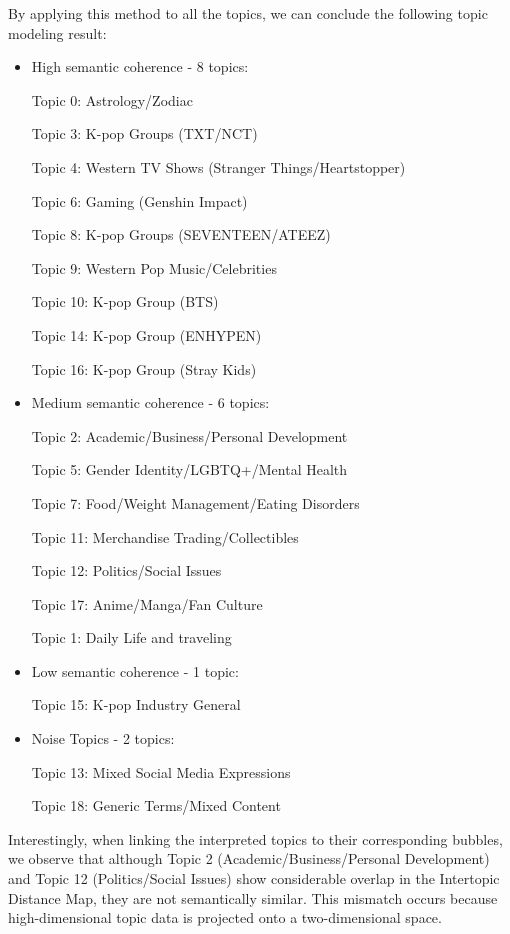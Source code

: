 \documentclass[12pt]{article}
\begin{document}
	By applying this method to all the topics, we can conclude the following topic modeling result:
	\begin{itemize}
	\item High semantic coherence - 8 topics:
	
		Topic 0: Astrology/Zodiac
		
		Topic 3: K-pop Groups (TXT/NCT)
		
		Topic 4: Western TV Shows (Stranger Things/Heartstopper)
		
		Topic 6: Gaming (Genshin Impact)
		
		Topic 8: K-pop Groups (SEVENTEEN/ATEEZ)
		
		Topic 9: Western Pop Music/Celebrities
		
		Topic 10: K-pop Group (BTS)
		
		Topic 14: K-pop Group (ENHYPEN)
		
		Topic 16: K-pop Group (Stray Kids)
	\item 	Medium semantic coherence - 6 topics:
	
		Topic 2: Academic/Business/Personal Development
		
		Topic 5: Gender Identity/LGBTQ+/Mental Health
		
		Topic 7: Food/Weight Management/Eating Disorders
		
		Topic 11: Merchandise Trading/Collectibles
		
		Topic 12: Politics/Social Issues
		
		Topic 17: Anime/Manga/Fan Culture
		
		Topic 1: Daily Life and traveling
	\item 	Low semantic coherence - 1 topic:
	
		Topic 15: K-pop Industry General
	\item Noise Topics - 2 topics:
	
		Topic 13: Mixed Social Media Expressions
		
		Topic 18: Generic Terms/Mixed Content
	\end{itemize}
	
	Interestingly, when linking the interpreted topics to their corresponding bubbles, we observe that although Topic 2 (Academic/Business/Personal Development) and Topic 12 (Politics/Social Issues) show considerable overlap in the Intertopic Distance Map, they are not semantically similar. This mismatch occurs because high-dimensional topic data is projected onto a two-dimensional space. 
	
\end{document}
